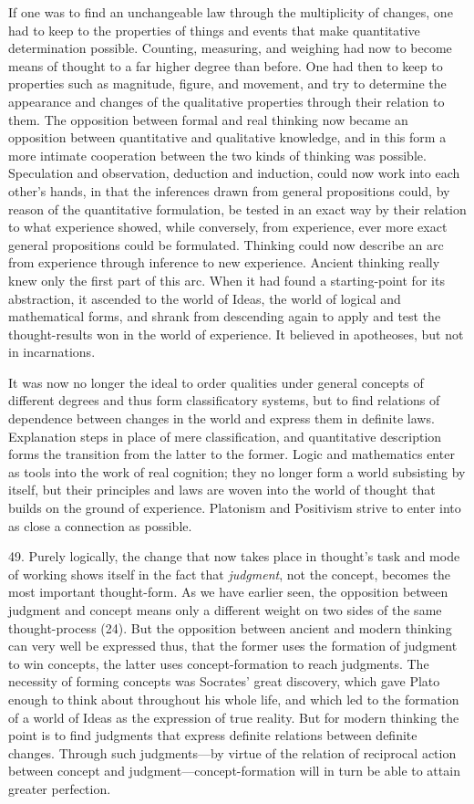 \documentclass[12pt,a4paper]{book}
\newcommand{\opage}[1]{\marginnote{\footnotesize\textit{[#1]}}}
\begin{document}
If one was to find an unchangeable law through the multiplicity of changes,
one had to keep to the properties of things and events that make
quantitative determination possible. Counting, measuring, and weighing had
now to become means of thought to a far higher degree than before. One had
then to keep to properties such as magnitude, figure, and movement, and try
to determine the appearance and changes of the qualitative properties
through their relation to them. The opposition between formal and real
thinking now became an opposition between quantitative and qualitative
knowledge, and in this form a more intimate cooperation between the two
kinds of thinking was possible. Speculation and observation, deduction and
induction, could now work into each other's hands, in that the inferences
drawn from general propositions could, by reason of the quantitative
formulation, be tested in an exact way by their relation to what experience
showed, while conversely, from experience, ever \opage{129}more exact general
propositions could be formulated. Thinking could now describe an arc from
experience through inference to new experience. Ancient thinking really
knew only the first part of this arc. When it had found a starting-point
for its abstraction, it ascended to the world of Ideas, the world of
logical and mathematical forms, and shrank from descending again to apply
and test the thought-results won in the world of experience. It believed in
apotheoses, but not in incarnations.

It was now no longer the ideal to order qualities under general concepts of
different degrees and thus form classificatory systems, but to find
relations of dependence between changes in the world and express them in
definite laws. Explanation steps in place of mere classification, and
quantitative description forms the transition from the latter to the
former. Logic and mathematics enter as tools into the work of real
cognition; they no longer form a world subsisting by itself, but their
principles and laws are woven into the world of thought that builds on the
ground of experience. Platonism and Positivism strive to enter into as
close a connection as possible.

49. Purely logically, the change that now takes place in thought's task
and mode of working shows itself in the fact that \emph{judgment}, not the concept, becomes the most important thought-form. As we have earlier seen,
the opposition between judgment and concept means only a different weight on
two sides of the same thought-process (24). But the opposition between
ancient and modern thinking can very well be expressed thus, that the
former uses the formation of judgment to win concepts, the latter uses
concept-formation to reach judgments. The necessity of forming concepts was
Socrates' great discovery, which gave Plato enough to think about
throughout his whole life, and which led to the formation of a world of
Ideas as the expression of true reality. But for modern thinking the point
is to find judgments that express definite relations between definite
changes. Through such judgments---by virtue of the \opage{130}relation of reciprocal
action between concept and judgment---concept-formation will in turn be able
to attain greater perfection.
\end{document}
